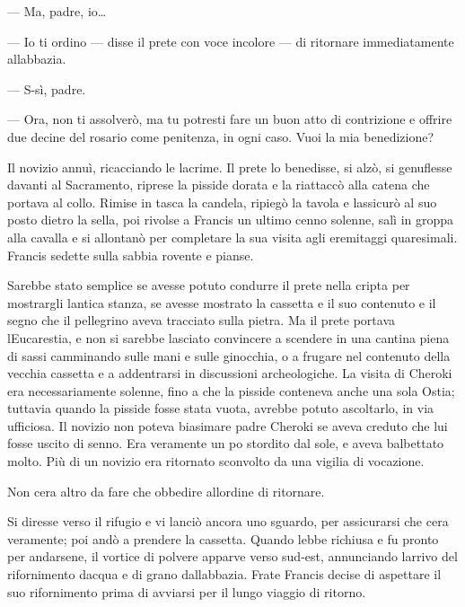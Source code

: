 --- Ma, padre, io\ldots{}

--- Io ti ordino --- disse il prete con voce incolore --- di ritornare
immediatamente all\textquotesingle abbazia.

--- S-sì, padre.

--- Ora, non ti assolverò, ma tu potresti fare un buon atto di
contrizione e offrire due decine del rosario come penitenza, in ogni
caso. Vuoi la mia benedizione?

Il novizio annuì, ricacciando le lacrime. Il prete lo benedisse, si
alzò, si genuflesse davanti al Sacramento, riprese la pisside dorata e
la riattaccò alla catena che portava al collo. Rimise in tasca la
candela, ripiegò la tavola e l\textquotesingle assicurò al suo posto
dietro la sella, poi rivolse a Francis un ultimo cenno solenne, salì in
groppa alla cavalla e si allontanò per completare la sua visita agli
eremitaggi quaresimali. Francis sedette sulla sabbia rovente e pianse.

Sarebbe stato semplice se avesse potuto condurre il prete nella cripta
per mostrargli l\textquotesingle antica stanza, se avesse mostrato la
cassetta e il suo contenuto e il segno che il pellegrino aveva tracciato
sulla pietra. Ma il prete portava l\textquotesingle Eucarestia, e non si
sarebbe lasciato convincere a scendere in una cantina piena di sassi
camminando sulle mani e sulle ginocchia, o a frugare nel contenuto della
vecchia cassetta e a addentrarsi in discussioni archeologiche. La visita
di Cheroki era necessariamente solenne, fino a che la pisside conteneva
anche una sola Ostia; tuttavia quando la pisside fosse stata vuota,
avrebbe potuto ascoltarlo, in via ufficiosa. Il novizio non poteva
biasimare padre Cheroki se aveva creduto che lui fosse uscito di senno.
Era veramente un po\textquotesingle{} stordito dal sole, e aveva
balbettato molto. Più di un novizio era ritornato sconvolto da una
vigilia di vocazione.

Non c\textquotesingle era altro da fare che obbedire
all\textquotesingle ordine di ritornare.

Si diresse verso il rifugio e vi lanciò ancora uno sguardo, per
assicurarsi che c\textquotesingle era veramente; poi andò a prendere la
cassetta. Quando l\textquotesingle ebbe richiusa e fu pronto per
andarsene, il vortice di polvere apparve verso sud-est, annunciando
l\textquotesingle arrivo del rifornimento d\textquotesingle acqua e di
grano dall\textquotesingle abbazia. Frate Francis decise di aspettare il
suo rifornimento prima di avviarsi per il lungo viaggio di ritorno.

